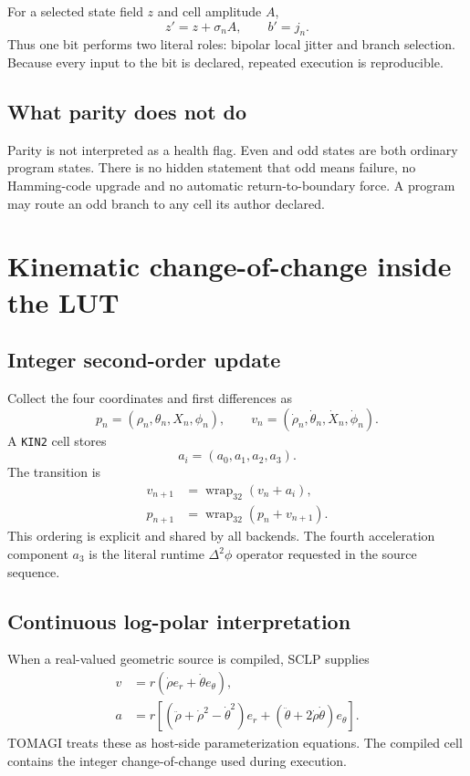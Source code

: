 \documentclass[11pt,a4paper]{article}
\newcommand{\code}[1]{\texttt{#1}}
\begin{document}
For a selected state field $z$ and cell amplitude $A$,
\begin{equation}
z' = z + \sigma_n A,\qquad b'=j_n.
\end{equation}
Thus one bit performs two literal roles: bipolar local jitter and branch selection. Because every input to the bit is declared, repeated execution is reproducible.

\subsection{What parity does not do}
Parity is not interpreted as a health flag. Even and odd states are both ordinary program states. There is no hidden statement that odd means failure, no Hamming-code upgrade and no automatic return-to-boundary force. A program may route an odd branch to any cell its author declared.

\section{Kinematic change-of-change inside the LUT}

\subsection{Integer second-order update}
Collect the four coordinates and first differences as
\begin{equation}
p_n=(\rho_n,\theta_n,X_n,\phi_n),\qquad v_n=(\dot\rho_n,\dot\theta_n,\dot X_n,\dot\phi_n).
\end{equation}
A \code{KIN2} cell stores
\begin{equation}
a_i=(a_0,a_1,a_2,a_3).
\end{equation}
The transition is
\begin{align}
v_{n+1}&=\operatorname{wrap}_{32}(v_n+a_i),\\
p_{n+1}&=\operatorname{wrap}_{32}(p_n+v_{n+1}).
\end{align}
This ordering is explicit and shared by all backends. The fourth acceleration component $a_3$ is the literal runtime $\Delta^2\phi$ operator requested in the source sequence.

\subsection{Continuous log-polar interpretation}
When a real-valued geometric source is compiled, SCLP supplies
\begin{align}
v&=r(\dot\rho e_r+\dot\theta e_\theta),\\
a&=r\left[(\ddot\rho+\dot\rho^2-\dot\theta^2)e_r+(\ddot\theta+2\dot\rho\dot\theta)e_\theta\right].
\end{align}
TOMAGI treats these as host-side parameterization equations. The compiled cell contains the integer change-of-change used during execution.
\end{document}
